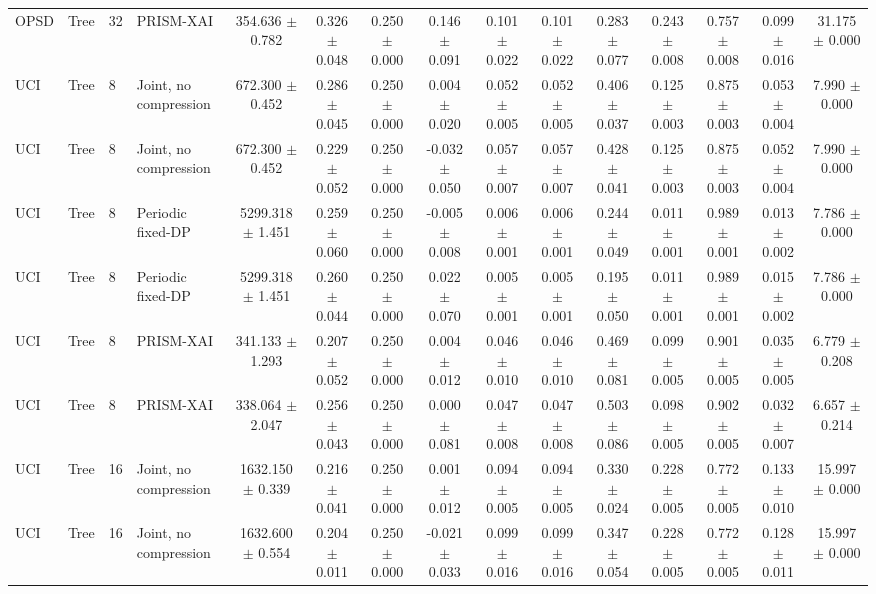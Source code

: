 \begin{tabular}{llllccccccccccc}
OPSD & Tree & 32 & PRISM-XAI & 354.636 $\pm$ 0.782 & 0.326 $\pm$ 0.048 & 0.250 $\pm$ 0.000 & 0.146 $\pm$ 0.091 & 0.101 $\pm$ 0.022 & 0.101 $\pm$ 0.022 & 0.283 $\pm$ 0.077 & 0.243 $\pm$ 0.008 & 0.757 $\pm$ 0.008 & 0.099 $\pm$ 0.016 & 31.175 $\pm$ 0.000 \\
UCI & Tree & 8 & Joint, no compression & 672.300 $\pm$ 0.452 & 0.286 $\pm$ 0.045 & 0.250 $\pm$ 0.000 & 0.004 $\pm$ 0.020 & 0.052 $\pm$ 0.005 & 0.052 $\pm$ 0.005 & 0.406 $\pm$ 0.037 & 0.125 $\pm$ 0.003 & 0.875 $\pm$ 0.003 & 0.053 $\pm$ 0.004 & 7.990 $\pm$ 0.000 \\
UCI & Tree & 8 & Joint, no compression & 672.300 $\pm$ 0.452 & 0.229 $\pm$ 0.052 & 0.250 $\pm$ 0.000 & -0.032 $\pm$ 0.050 & 0.057 $\pm$ 0.007 & 0.057 $\pm$ 0.007 & 0.428 $\pm$ 0.041 & 0.125 $\pm$ 0.003 & 0.875 $\pm$ 0.003 & 0.052 $\pm$ 0.004 & 7.990 $\pm$ 0.000 \\
UCI & Tree & 8 & Periodic fixed-DP & 5299.318 $\pm$ 1.451 & 0.259 $\pm$ 0.060 & 0.250 $\pm$ 0.000 & -0.005 $\pm$ 0.008 & 0.006 $\pm$ 0.001 & 0.006 $\pm$ 0.001 & 0.244 $\pm$ 0.049 & 0.011 $\pm$ 0.001 & 0.989 $\pm$ 0.001 & 0.013 $\pm$ 0.002 & 7.786 $\pm$ 0.000 \\
UCI & Tree & 8 & Periodic fixed-DP & 5299.318 $\pm$ 1.451 & 0.260 $\pm$ 0.044 & 0.250 $\pm$ 0.000 & 0.022 $\pm$ 0.070 & 0.005 $\pm$ 0.001 & 0.005 $\pm$ 0.001 & 0.195 $\pm$ 0.050 & 0.011 $\pm$ 0.001 & 0.989 $\pm$ 0.001 & 0.015 $\pm$ 0.002 & 7.786 $\pm$ 0.000 \\
UCI & Tree & 8 & PRISM-XAI & 341.133 $\pm$ 1.293 & 0.207 $\pm$ 0.052 & 0.250 $\pm$ 0.000 & 0.004 $\pm$ 0.012 & 0.046 $\pm$ 0.010 & 0.046 $\pm$ 0.010 & 0.469 $\pm$ 0.081 & 0.099 $\pm$ 0.005 & 0.901 $\pm$ 0.005 & 0.035 $\pm$ 0.005 & 6.779 $\pm$ 0.208 \\
UCI & Tree & 8 & PRISM-XAI & 338.064 $\pm$ 2.047 & 0.256 $\pm$ 0.043 & 0.250 $\pm$ 0.000 & 0.000 $\pm$ 0.081 & 0.047 $\pm$ 0.008 & 0.047 $\pm$ 0.008 & 0.503 $\pm$ 0.086 & 0.098 $\pm$ 0.005 & 0.902 $\pm$ 0.005 & 0.032 $\pm$ 0.007 & 6.657 $\pm$ 0.214 \\
UCI & Tree & 16 & Joint, no compression & 1632.150 $\pm$ 0.339 & 0.216 $\pm$ 0.041 & 0.250 $\pm$ 0.000 & 0.001 $\pm$ 0.012 & 0.094 $\pm$ 0.005 & 0.094 $\pm$ 0.005 & 0.330 $\pm$ 0.024 & 0.228 $\pm$ 0.005 & 0.772 $\pm$ 0.005 & 0.133 $\pm$ 0.010 & 15.997 $\pm$ 0.000 \\
UCI & Tree & 16 & Joint, no compression & 1632.600 $\pm$ 0.554 & 0.204 $\pm$ 0.011 & 0.250 $\pm$ 0.000 & -0.021 $\pm$ 0.033 & 0.099 $\pm$ 0.016 & 0.099 $\pm$ 0.016 & 0.347 $\pm$ 0.054 & 0.228 $\pm$ 0.005 & 0.772 $\pm$ 0.005 & 0.128 $\pm$ 0.011 & 15.997 $\pm$ 0.000 \\

\end{tabular}
